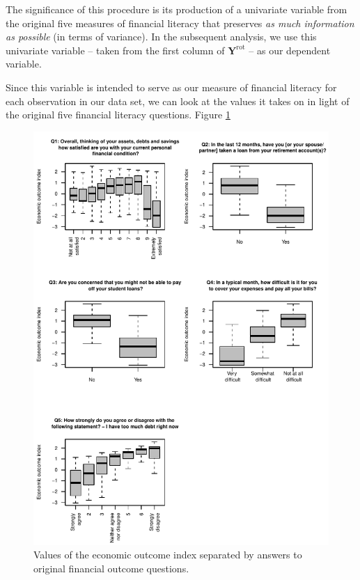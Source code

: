 \documentclass[12pt]{article}
\theoremstyle{plain}
\begin{document}
The significance of this procedure is its production of a univariate variable from the original five measures of financial literacy that preserves \textit{as much information as possible} (in terms of variance).  In the subsequent analysis, we use this univariate variable -- taken from the first column of $\textbf{Y}^{\text{rot}}$ -- as our dependent variable.

Since this variable is intended to serve as our measure of financial literacy for each observation in our data set, we can look at the values it takes on in light of the original five financial literacy questions.  Figure \ref{dep1} 

\begin{figure}[H]
\centering
\caption{Values of the economic outcome index separated by answers to original financial outcome questions.}
	\centerline{\includegraphics[scale=1.2]{biplots.pdf}}
	\label{dep1}
\end{figure}



\clearpage
\newpage 
\renewcommand{\bibsep}{0.5pt}


\begin{spacing}{1.2}
%



\end{spacing}
\end{document}
